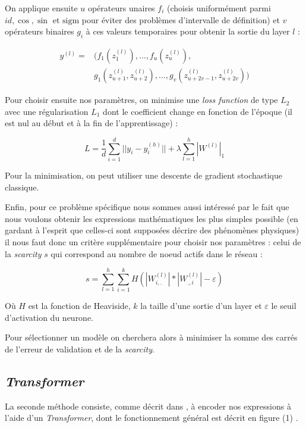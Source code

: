 \documentclass[a4paper,12pt]{article}
\begin{document}
On applique ensuite $u$ opérateurs unaires $f_i$ (choisis uniformément parmi $id, \cos, \sin$ et $\text{sigm}$ pour éviter des problèmes d'intervalle de définition) et $v$ opérateurs binaires $g_i$ à ces valeurs temporaires pour obtenir la sortie du layer $l$ :

\begin{align*}
    y^{(l)} = &(f_1(z^{(l)}_1), ..., f_u(z^{(l)}_u), \\
            & g_1(z^{(l)}_{u+1},z^{(l)}_{u+2}),...,g_v(z^{(l)}_{u+2v-1},z^{(l)}_{u+2v}))
\end{align*}

Pour choisir ensuite nos paramètres, on minimise une \textit{loss function} de type $L_2$ avec une régularisation $L_1$ dont le coefficient change en fonction de l'époque (il est nul au début et à la fin de l'apprentissage) :

\begin{equation*}
    L = \frac{1}{d} \sum_{i=1}^d ||y_i - y^{(h)}_i|| + \lambda \sum_{l=1}^{h} |W^{(l)}|_1
\end{equation*}

Pour la minimisation, on peut utiliser une descente de gradient stochastique classique.

Enfin, pour ce problème spécifique nous sommes aussi intéressé par le fait que nous voulons obtenir les expressions mathématiques les plus simples possible (en gardant à l'esprit que celles-ci sont supposées décrire des phénomènes physiques) il nous faut donc un critère supplémentaire pour choisir nos paramètres : celui de la \textit{scarcity} $s$ qui correspond au nombre de noeud actifs dans le réseau :

\begin{equation*}
    s = \sum_{l=1}^h \sum_{i=1}^k H(|W^{(l)}_{i,.}| * |W^{(l)}_{.,i}| - \varepsilon)
\end{equation*}

Où $H$ est la fonction de Heaviside, $k$ la taille d'une sortie d'un layer et $\varepsilon$ le seuil d'activation du neurone.

Pour sélectionner un modèle on cherchera alors à minimiser la somme des carrés de l'erreur de validation et de la \textit{scarcity}.

\subsection{\emph{Transformer}}

La seconde méthode consiste, comme décrit dans \cite{kamienny}, à encoder nos expressions à l'aide d'un \emph{Transformer}, dont le fonctionnement général est décrit en figure (1) \label{transfo}.
\end{document}
